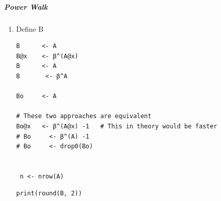 \documentclass[11pt]{article}
\begin{document}
\subparagraph{Power Walk}
\label{sec:org0c73430}
\begin{enumerate}
\item Define B
\label{sec:orgdaecede}
\lstset{language=r,label= ,caption= ,captionpos=b,numbers=none}
\begin{lstlisting}
B      <- A
B@x    <- β^(A@x)
B      <- A
B       <- β^A

Bo     <- A

# These two approaches are equivalent
Bo@x   <- β^(A@x) -1   # This in theory would be faster
# Bo     <- β^(A) -1
# Bo     <- drop0(Bo)


 n <- nrow(A)
\end{lstlisting}

\lstset{language=r,label= ,caption= ,captionpos=b,numbers=none}
\begin{lstlisting}
print(round(B, 2))
\end{lstlisting}


\end{enumerate}
\end{document}
